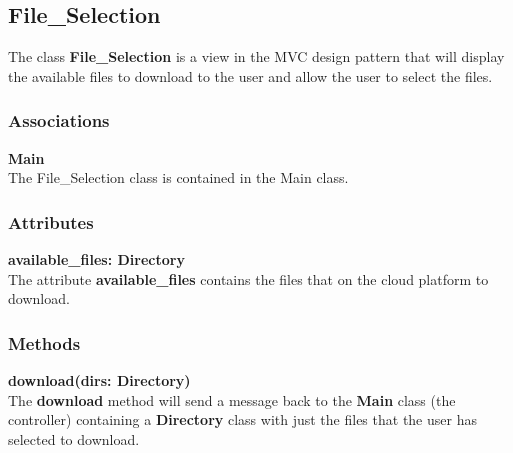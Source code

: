 \subsection{File\_Selection}
The class \textbf{File\_Selection} is a view in the MVC design pattern that will display
the available files to download to the user and allow the user to select the files.

\subsubsection{Associations}
\textbf{Main} \\
The File\_Selection class is contained in the Main class.

\subsubsection{Attributes}
\textbf{available\_files: Directory} \\
The attribute \textbf{available\_files} contains the files that on the cloud platform to
download.

\subsubsection{Methods}
\textbf{download(dirs: Directory)} \\
The \textbf{download} method will send a message back to the \textbf{Main} class
(the controller) containing a \textbf{Directory} class with just the files that the user
has selected to download.
